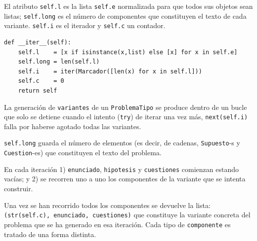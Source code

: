 \documentclass[10pt,a4paper]{report}
\begin{document}
El atributo \texttt{self.l} es la lista \texttt{self.e} normalizada para que todos sus objetos sean listas; \texttt{self.long} es el número de componentes que constituyen el texto de cada variante. 
\texttt{self.i} es el iterador y \texttt{self.c} un contador.
\begin{verbatim}
def __iter__(self):
    self.l    = [x if isinstance(x,list) else [x] for x in self.e]
    self.long = len(self.l)
    self.i    = iter(Marcador([len(x) for x in self.l]))
    self.c    = 0
    return self
\end{verbatim}

La generación de \texttt{variantes} de un \texttt{ProblemaTipo} se produce dentro de un bucle que solo se detiene cuando el intento (\texttt{try}) de iterar una vez más, \texttt{next(self.i)} falla por haberse agotado todas las variantes.

\texttt{self.long} guarda el número de elementos (es decir, de cadenas, \texttt{Supuesto}-s y \texttt{Cuestion}-es) que constituyen el texto del problema.

En cada iteración 1) \texttt{enunciado}, \texttt{hipotesis} y \texttt{cuestiones} comienzan estando vacías; y 2) se recorren uno a uno los componentes de la variante que se intenta construir.

Una vez se han recorrido todos los componentes se devuelve la lista: 
\texttt{(str(self.c), enunciado, cuestiones)} que constituye la variante concreta del problema que se ha generado en esa iteración.
Cada tipo de \texttt{componente} es tratado de una forma distinta.
\end{document}
